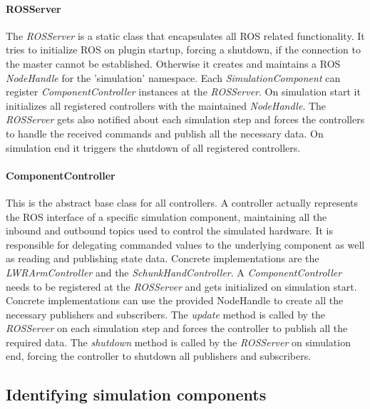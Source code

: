 \paragraph{ROSServer}

The \emph{ROSServer} is a static class that encapsulates all ROS related functionality. It tries to initialize ROS on plugin startup, forcing a shutdown, if the connection to the master cannot be established. Otherwise it creates and maintains a ROS \emph{NodeHandle} for the 'simulation' namespace. Each \emph{SimulationComponent} can register \emph{ComponentController} instances at the \emph{ROSServer}. On simulation start it initializes all registered controllers with the maintained \emph{NodeHandle}. The \emph{ROSServer} gets also notified about each simulation step and forces the controllers to handle the received commands and publish all the necessary data. On simulation end it triggers the shutdown of all registered controllers.
  
\paragraph{ComponentController}

This is the abstract base class for all controllers. A controller actually represents the ROS interface of a specific simulation component, maintaining all the inbound and outbound topics used to control the simulated hardware. It is responsible for delegating commanded values to the underlying component as well as reading and publishing state data. Concrete implementations are the \emph{LWRArmController} and the \emph{SchunkHandController}. A \emph{ComponentController} needs to be registered at the \emph{ROSServer} and gets initialized on simulation start. Concrete implementations can use the provided NodeHandle to create all the necessary publishers and subscribers. The \emph{update} method is called by the \emph{ROSServer} on each simulation step and forces the controller to publish all the required data. The \emph{shutdown} method is called by the \emph{ROSServer} on simulation end, forcing the controller to shutdown all publishers and subscribers. \\

\subsection{Identifying simulation components}
\label{sec:comp_id}

